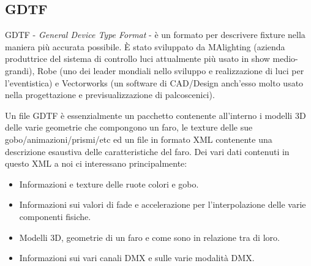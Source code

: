 \documentclass[main.tex]{subfiles}
\begin{document}
\subsection{GDTF}\label{subsec:1_gdtf}
GDTF - \textit{General Device Type Format} - è un formato per descrivere fixture nella maniera più accurata possibile. È stato sviluppato da MAlighting (azienda produttrice del sistema di controllo luci attualmente più usato in show medio-grandi), Robe (uno dei leader mondiali nello sviluppo e realizzazione di luci per l'eventistica) e Vectorworks (un software di CAD/Design anch'esso molto usato nella progettazione e previsualizzazione di palcoscenici). 
\newline

Un file GDTF è essenzialmente un pacchetto contenente all'interno i modelli 3D delle varie geometrie che compongono un faro, le texture delle sue gobo/animazioni/prismi/etc ed un file in formato XML contenente una descrizione esaustiva delle caratteristiche del faro. \newline
Dei vari dati contenuti in questo XML a noi ci interessano principalmente:
\begin{itemize}
    \item Informazioni e texture delle ruote colori e gobo.
    \item Informazioni sui valori di fade e accelerazione per l'interpolazione delle varie componenti fisiche.
    \item Modelli 3D, geometrie di un faro e come sono in relazione tra di loro.
    \item Informazioni sui vari canali DMX e sulle varie modalità DMX.
\end{itemize}
\end{document}
